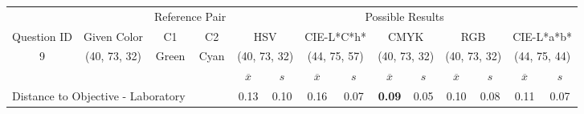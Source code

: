 \begin{table}[H]
  \resizebox{\textwidth}{!} {
  \begin{tabular}{lccccccccccccc}
    \hline
    \multicolumn{1}{c}{}                              &                                      & \multicolumn{2}{c}{Reference Pair}                   & \multicolumn{10}{c}{Possible Results}                                                                                                                                                                                                                                                                                        \\ \cline{3-14}
    \multicolumn{1}{c}{\multirow{-2}{*}{Question ID}} & \multirow{-2}{*}{Given Color}        & C1                       & C2                         & \multicolumn{2}{c}{HSV}                                        & \multicolumn{2}{c}{CIE-L*C*h*}                                 & \multicolumn{2}{c}{CMYK}                                       & \multicolumn{2}{c}{RGB}                                        & \multicolumn{2}{c}{CIE-L*a*b*}                                 \\ \hline
    \multicolumn{1}{c}{9}                             & \cellcolor[HTML]{00FF80}(40, 73, 32) & \multicolumn{1}{c|}{Green} & \multicolumn{1}{c|}{Cyan}  & \multicolumn{2}{c|}{\cellcolor[HTML]{00FF80}(40, 73, 32)}      & \multicolumn{2}{c|}{\cellcolor[HTML]{00FFB7}(44, 75, 57)}       & \multicolumn{2}{c|}{\cellcolor[HTML]{00FF80}(40, 73, 32)}       & \multicolumn{2}{c|}{\cellcolor[HTML]{00FF80}(40, 73, 32)}       & \multicolumn{2}{c|}{\cellcolor[HTML]{46FF9C}(44, 75, 44)}       \\ \hline
                                                      & \multicolumn{1}{l}{}                 & \multicolumn{1}{l}{}     & \multicolumn{1}{l}{}       & \multicolumn{1}{c}{$\overline{x}$} & \multicolumn{1}{c}{$s$} & \multicolumn{1}{c}{$\overline{x}$} & \multicolumn{1}{c}{$s$} & \multicolumn{1}{c}{$\overline{x}$} & \multicolumn{1}{c}{$s$} & \multicolumn{1}{c}{$\overline{x}$} & \multicolumn{1}{c}{$s$} & \multicolumn{1}{c}{$\overline{x}$} & \multicolumn{1}{c}{$s$} \\ \hline
    \multicolumn{4}{l}{Distance to Objective - Laboratory}                                                                                           & \multicolumn{1}{|c}{0.13}       & \multicolumn{1}{c|}{0.10}    & \multicolumn{1}{|c}{0.16}       & \multicolumn{1}{c|}{0.07}    & \multicolumn{1}{|c}{\textbf{0.09}}       & \multicolumn{1}{c|}{0.05}    & \multicolumn{1}{|c}{0.10}       & \multicolumn{1}{c|}{0.08}    & \multicolumn{1}{|c}{0.11}       & \multicolumn{1}{c|}{0.07}    \\

\end{tabular}}
\end{table}

